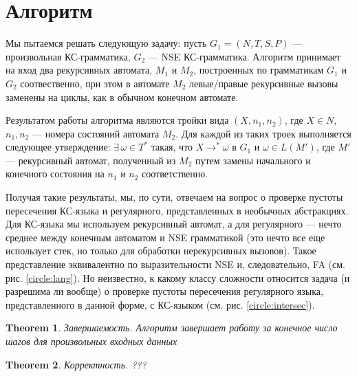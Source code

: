 \documentclass[14pt]{matmex-diploma-custom}
\newtheorem{theorem}{Theorem}
\begin{document}
\section{Алгоритм}
	
Мы пытаемся решать следующую задачу: пусть $G_1 = (N, T, S, P)$ --- произвольная КС-грамматика, $G_2$ --- NSE КС-грамматика. Алгоритм принимает на вход два рекурсивных автомата, $M_1$ и $M_2$, построенных по грамматикам $G_1$ и $G_2$ соотвественно, при этом в автомате $M_2$ левые/правые рекурсивные вызовы заменены на циклы, как в обычном конечном автомате.

Результатом работы алгоритма являются тройки вида $(X, n_1, n_2)$, где $X \in N$, $n_1, n_2$ --- номера состояний автомата $M_2$. 
Для каждой из таких троек выполняется следующее утверждение: $\exists \, \omega \in T^*$ такая, что $X \rightarrow^* \omega$ в $G_1$ и $\omega \in L(M')$, где $M'$ --- рекурсивный автомат, полученный из $M_2$ путем замены начального и конечного состояния на $n_1$ и $n_2$ соответственно.
	
Получая такие результаты, мы, по сути, отвечаем на вопрос о проверке пустоты пересечения КС-языка и регулярного, представленных в необычных абстракциях. 
Для КС-языка мы используем рекурсивный автомат, а для регулярного --- нечто среднее между конечным автоматом и NSE грамматикой (это нечто все еще использует стек, но только для обработки нерекурсивных вызовов). 
Такое представление эквивалентно по выразительности NSE и, следовательно, FA (см. рис. \ref{circle:lang}). 
Но неизвестно, к какому классу сложности относится задача (и разрешима ли вообще) о проверке пустоты пересечения регулярного языка, представленного в данной форме, с КС-языком (см. рис. \ref{circle:intersec}).
	
\begin{theorem}{Завершаемость.}
	Алгоритм завершает работу за конечное число шагов для произвольных входных данных
\end{theorem}
	
\begin{theorem}{Корректность.}
	???
\end{theorem}
\end{document}
